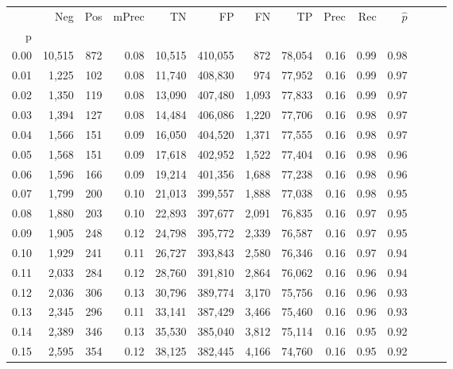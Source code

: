 \begin{tabular}{rrrrrrrrrrrrrr}
\toprule
{} &     Neg &    Pos & mPrec &       TN &       FP &      FN &      TP &  Prec &   Rec & $\hat{p}$ \\
p    &         &        &       &          &          &         &         &       &       &           \\
\midrule
0.00 &  10,515 &    872 &  0.08 &   10,515 &  410,055 &     872 &  78,054 &  0.16 &  0.99 &      0.98 \\
0.01 &   1,225 &    102 &  0.08 &   11,740 &  408,830 &     974 &  77,952 &  0.16 &  0.99 &      0.97 \\
0.02 &   1,350 &    119 &  0.08 &   13,090 &  407,480 &   1,093 &  77,833 &  0.16 &  0.99 &      0.97 \\
0.03 &   1,394 &    127 &  0.08 &   14,484 &  406,086 &   1,220 &  77,706 &  0.16 &  0.98 &      0.97 \\
0.04 &   1,566 &    151 &  0.09 &   16,050 &  404,520 &   1,371 &  77,555 &  0.16 &  0.98 &      0.97 \\
0.05 &   1,568 &    151 &  0.09 &   17,618 &  402,952 &   1,522 &  77,404 &  0.16 &  0.98 &      0.96 \\
0.06 &   1,596 &    166 &  0.09 &   19,214 &  401,356 &   1,688 &  77,238 &  0.16 &  0.98 &      0.96 \\
0.07 &   1,799 &    200 &  0.10 &   21,013 &  399,557 &   1,888 &  77,038 &  0.16 &  0.98 &      0.95 \\
0.08 &   1,880 &    203 &  0.10 &   22,893 &  397,677 &   2,091 &  76,835 &  0.16 &  0.97 &      0.95 \\
0.09 &   1,905 &    248 &  0.12 &   24,798 &  395,772 &   2,339 &  76,587 &  0.16 &  0.97 &      0.95 \\
0.10 &   1,929 &    241 &  0.11 &   26,727 &  393,843 &   2,580 &  76,346 &  0.16 &  0.97 &      0.94 \\
0.11 &   2,033 &    284 &  0.12 &   28,760 &  391,810 &   2,864 &  76,062 &  0.16 &  0.96 &      0.94 \\
0.12 &   2,036 &    306 &  0.13 &   30,796 &  389,774 &   3,170 &  75,756 &  0.16 &  0.96 &      0.93 \\
0.13 &   2,345 &    296 &  0.11 &   33,141 &  387,429 &   3,466 &  75,460 &  0.16 &  0.96 &      0.93 \\
0.14 &   2,389 &    346 &  0.13 &   35,530 &  385,040 &   3,812 &  75,114 &  0.16 &  0.95 &      0.92 \\
0.15 &   2,595 &    354 &  0.12 &   38,125 &  382,445 &   4,166 &  74,760 &  0.16 &  0.95 &      0.92 \\

\end{tabular}
